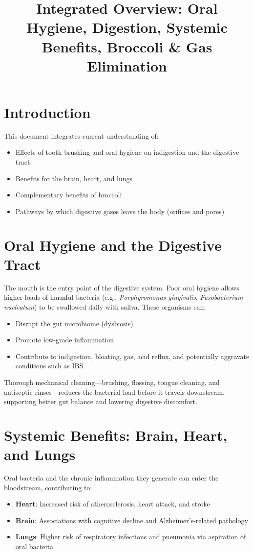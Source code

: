 \documentclass[11pt,a4paper]{article}
\title{Integrated Overview: Oral Hygiene, Digestion, Systemic Benefits, Broccoli \& Gas Elimination}
\author{}
\date{}
\begin{document}
\maketitle

\section*{Introduction}
This document integrates current understanding of:
\begin{itemize}[leftmargin=*]
    \item Effects of tooth brushing and oral hygiene on indigestion and the digestive tract
    \item Benefits for the brain, heart, and lungs
    \item Complementary benefits of broccoli
    \item Pathways by which digestive gases leave the body (orifices and pores)
\end{itemize}

\section{Oral Hygiene and the Digestive Tract}
The mouth is the entry point of the digestive system. Poor oral hygiene allows higher loads of harmful bacteria (e.g., \textit{Porphyromonas gingivalis}, \textit{Fusobacterium nucleatum}) to be swallowed daily with saliva. These organisms can:
\begin{itemize}
    \item Disrupt the gut microbiome (dysbiosis)
    \item Promote low-grade inflammation
    \item Contribute to indigestion, bloating, gas, acid reflux, and potentially aggravate conditions such as IBS
\end{itemize}

Thorough mechanical cleaning---brushing, flossing, tongue cleaning, and antiseptic rinses---reduces the bacterial load before it travels downstream, supporting better gut balance and lowering digestive discomfort.

\section{Systemic Benefits: Brain, Heart, and Lungs}
Oral bacteria and the chronic inflammation they generate can enter the bloodstream, contributing to:
\begin{itemize}
    \item \textbf{Heart}: Increased risk of atherosclerosis, heart attack, and stroke
    \item \textbf{Brain}: Associations with cognitive decline and Alzheimer's-related pathology
    \item \textbf{Lungs}: Higher risk of respiratory infections and pneumonia via aspiration of oral bacteria
\end{itemize}
\end{document}
